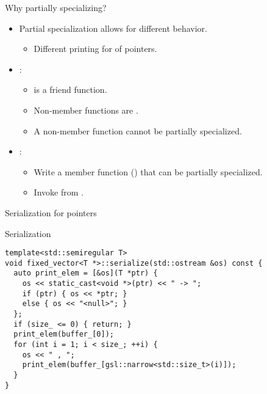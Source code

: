 \begin{frame}[t,fragile]{Why partially specializing?}
\begin{itemize}
  \item Partial specialization allows for different behavior.
    \begin{itemize}
      \item Different printing for  of pointers.
    \end{itemize}

  \item {}:
    \begin{itemize}
      \item {} is a friend function.
      \item Non-member functions are .
      \item A non-member function cannot be partially specialized.
    \end{itemize}

  \item {}:
    \begin{itemize}
      \item Write a member function () that can be partially specialized.
      \item Invoke  from .
    \end{itemize}
\end{itemize}
\end{frame}

\begin{frame}[t,fragile]{Serialization for pointers}
\begin{block}{Serialization}
\begin{lstlisting}
template<std::semiregular T>
void fixed_vector<T *>::serialize(std::ostream &os) const {
  auto print_elem = [&os](T *ptr) {
    os << static_cast<void *>(ptr) << " -> ";
    if (ptr) { os << *ptr; }
    else { os << "<null>"; }
  };
  if (size_ <= 0) { return; }
  print_elem(buffer_[0]);
  for (int i = 1; i < size_; ++i) {
    os << " , ";
    print_elem(buffer_[gsl::narrow<std::size_t>(i)]);
  }
}
\end{lstlisting}
\end{block}
\end{frame}
